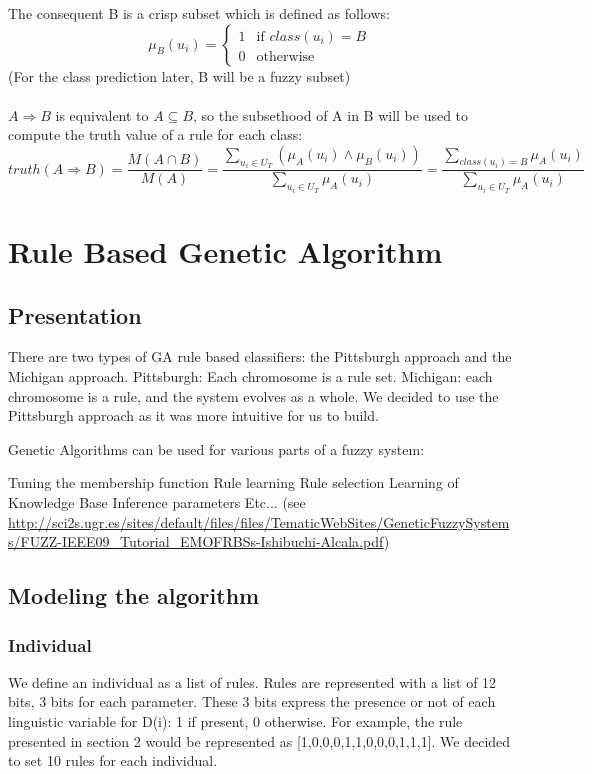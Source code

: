 \documentclass[a4paper,12pt]{article}
\begin{document}
The consequent B is a crisp subset which is defined as follows:
\[\mu_B(u_i)=
\begin{cases}
	1 & \text{if $class(u_i)=B$}\\
	0 & \text{otherwise}
\end{cases}\]
(For the class prediction later, B will be a fuzzy subset)\\
\\
$A\Rightarrow B$ is equivalent to $A\subseteq B$, so the subsethood of A in B will be used to compute the truth value of a rule for each class:
\[
	truth(A\Rightarrow B)=
	\frac{M(A\cap B)}{M(A)}=
	\frac
		{\sum\limits_{u_i\in U_T}{(\mu_A(u_i)\land \mu_B(u_i))}}
		{\sum\limits_{u_i\in U_T}{\mu_A(u_i)}}=
	\frac
		{\sum\limits_{class(u_i)=B}{\mu_A(u_i)}}
		{\sum\limits_{u_i\in U_T}{\mu_A(u_i)}}
\]

\section{Rule Based Genetic Algorithm}

\subsection{Presentation}

There are two types of GA rule based classifiers: the Pittsburgh approach and the Michigan approach. Pittsburgh: Each chromosome is a rule set. Michigan: each chromosome is a rule, and the system evolves as a whole. We decided to use the Pittsburgh approach as it was more intuitive for us to build.


Genetic Algorithms can be used for various parts of a fuzzy system:

Tuning the membership function
Rule learning
Rule selection
Learning of Knowledge Base
Inference parameters
Etc... (see \url{http://sci2s.ugr.es/sites/default/files/files/TematicWebSites/GeneticFuzzySystems/FUZZ-IEEE09_Tutorial_EMOFRBSs-Ishibuchi-Alcala.pdf})

\subsection{Modeling the algorithm}

\subsubsection{Individual}

We define an individual as a list of rules. Rules are represented with a list of 12 bits, 3 bits for each parameter.
These 3 bits express the presence or not of each linguistic variable for D(i): 1 if present, 0 otherwise.
For example, the rule presented in section 2 would be represented as [1,0,0,0,1,1,0,0,0,1,1,1].
We decided to set 10 rules for each individual.
\end{document}
